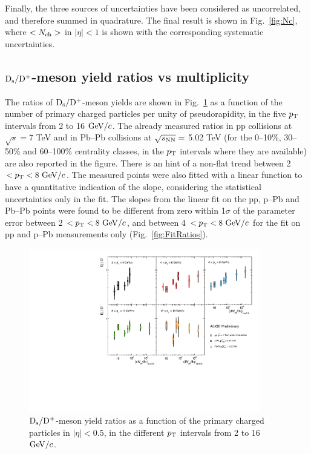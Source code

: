Finally, the three sources of uncertainties have been considered as uncorrelated, and therefore summed in quadrature. The final result is shown in Fig.~\ref{fig:Nc}, where $<N_{\rm ch}>$ in $|\eta|<1$ is shown with the corresponding systematic uncertainties.


\subsection{${\rm D_s}/{\rm D^+}$-meson yield ratios vs multiplicity }
The ratios of ${\rm D_s}/{\rm D^+}$-meson yields are shown in Fig.~\ref{fig:DsDplusRatios} as a function of
the number of primary charged particles per unity of pseudorapidity, in the five $p_{\rm T}$ intervals from 2 to 16 $\mathrm{GeV}/c$.
The already measured ratios in pp collisions at $\sqrt{s}=$7 TeV and in Pb--Pb collisions at $\sqrt{s_{\rm NN}}=$ 5.02 TeV
(for the 0--10\%, 30--50\% and 60--100\% centrality classes, in the $p_{\rm T}$ intervals where they are available) are also reported in the figure.
There is an hint of a non-flat trend between 2 $< p_{\rm T} < 8~\mathrm{GeV}/c$. The measured points were also
fitted with a linear function to have a quantitative indication of the slope, considering the statistical 
uncertainties only in the fit. The slopes from the linear fit on the pp, p--Pb and Pb--Pb points were found to be different from zero within 1$\sigma$ of the parameter error between 2 $< p_{\rm T} < 8 ~\mathrm{GeV}/c$, and between 4 $< p_{\rm T} < 8 ~\mathrm{GeV}/c$ for the
fit on pp and p--Pb measurements only (Fig.~\ref{fig:FitRatios}).

\begin{figure}[h!]
    \begin{center}
          \includegraphics[width=0.9\textwidth]{./FigCap6/DsOverDplusVsMult_pp7TeV_pPb5TeV_PbPb5TeV.pdf}
    \end{center}
    \caption{ ${\rm D_s}/{\rm D^+}$-meson yield ratios as a function of the primary charged particles in $|\eta|<0.5$, in the different $p_{\rm T}$ intervals from 2 to 16 $\mathrm{GeV}/c$.}
    \label{fig:DsDplusRatios}
\end{figure}

